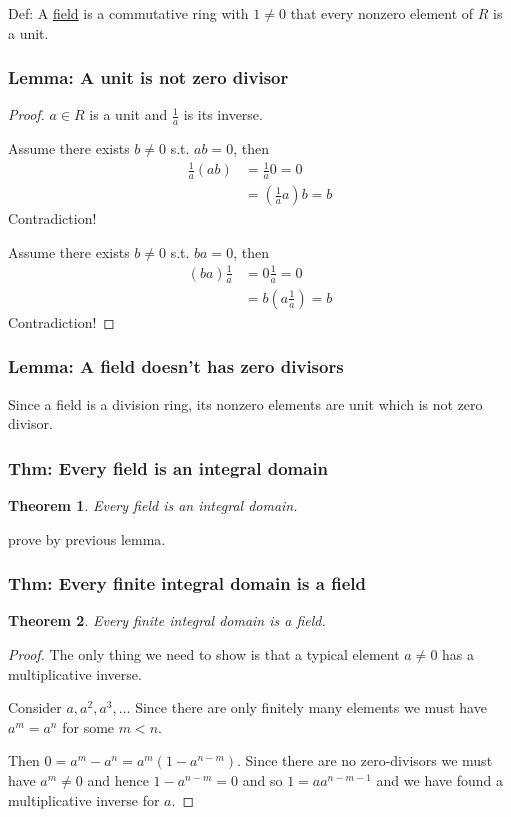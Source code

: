 \documentclass[11pt,a4paper]{article}
\newtheorem{theorem}{Theorem}
\begin{document}
Def: A \underline{field} is a commutative ring with $1\neq 0$ that every nonzero element of $R$ is a unit.

\subsubsection{Lemma: A unit is not zero divisor}
\begin{proof}
    $a\in R$ is a unit and $\frac{1}{a}$ is its inverse.

    Assume there exists $b\neq 0$ s.t. $ab=0$, then
    \begin{equation}
        \begin{aligned}
            \frac{1}{a}(ab)&=\frac{1}{a}0=0\\
            &=(\frac{1}{a}a)b=b
        \end{aligned}
        \nonumber
    \end{equation}
    Contradiction!

    Assume there exists $b\neq 0$ s.t. $ba=0$, then
    \begin{equation}
        \begin{aligned}
            (ba)\frac{1}{a}&=0\frac{1}{a}=0\\
            &=b(a\frac{1}{a})=b
        \end{aligned}
        \nonumber
    \end{equation}
    Contradiction!
\end{proof}
\subsubsection{Lemma: A field doesn't has zero divisors}
Since a field is a division ring, its nonzero elements are unit which is not zero divisor.

\subsubsection{Thm: Every field is an integral domain}
\begin{theorem}
    Every field is an integral domain.
\end{theorem}
prove by previous lemma.

\subsubsection{Thm: Every finite integral domain is a field}
\begin{theorem}
    Every finite integral domain is a field.
\end{theorem}
\begin{proof}
The only thing we need to show is that a typical element $a \neq 0$ has a multiplicative inverse.

Consider $a, a^2, a^3, ...$ Since there are only finitely many elements we must have $a^m = a^n$ for some $m < n$.

Then $0 = a^m - a^n = a^m(1 - a^{n-m})$. Since there are no zero-divisors we must have $a^m \neq 0$ and hence $1 - a^{n-m} = 0$ and so $1 = a a^{n-m-1}$ and we have found a multiplicative inverse for $a$.
\end{proof}
\end{document}
